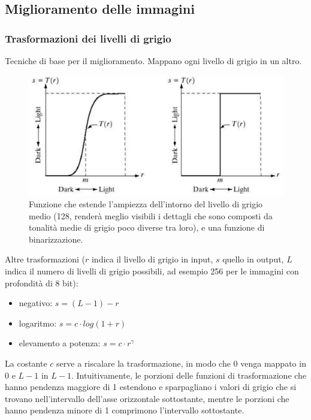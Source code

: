 \documentclass[a4paper,11pt]{article}
\begin{document}
\subsection{Miglioramento delle immagini}

\subsubsection{Trasformazioni dei livelli di grigio}
Tecniche di base per il miglioramento. Mappano ogni livello di grigio in un altro.

\renewcommand{\thefigure}{5.8}
\begin{figure}[!h]
  \centering
    \includegraphics[scale=0.3]{images/5/maps.png}
    \caption{Funzione che estende l'ampiezza dell'intorno del livello di grigio medio (128, renderà meglio visibili i dettagli che sono composti da tonalità medie di grigio poco diverse tra loro), e una funzione di binarizzazione.}
\end{figure}

Altre trasformazioni ($r$ indica il livello di grigio in input, $s$ quello in output, $L$ indica il numero di livelli di grigio possibili,
ad esempio 256 per le immagini con profondità di 8 bit):
\begin{itemize}
    \item negativo: $s = (L-1) - r$
    \item logaritmo: $s = c \cdot log(1+r)$
    \item elevamento a potenza: $s = c \cdot r^\gamma$
\end{itemize}
La costante $c$ serve a riscalare la trasformazione, in modo che 0 venga mappato in 0 e $L-1$ in $L-1$.
Intuitivamente, le porzioni delle funzioni di trasformazione che hanno pendenza maggiore di 1 estendono e sparpagliano i valori di grigio
che si trovano nell'intervallo dell'asse orizzontale sottostante, mentre le porzioni che hanno pendenza minore di 1 comprimono l'intervallo sottostante.
\par
\end{document}
